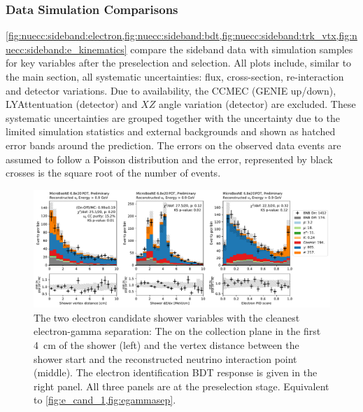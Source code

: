 \subsubsection{Data Simulation Comparisons}

 \cref{fig:nuecc:sideband:electron,fig:nuecc:sideband:bdt,fig:nuecc:sideband:trk_vtx,fig:nuecc:sideband:e_kinematics} compare the sideband data with simulation samples for key variables after the preselection and selection. All plots include, similar to the main section, all systematic uncertainties: flux, cross-section, re-interaction and detector variations. Due to availability, the CCMEC (GENIE up/down), LYAttentuation (detector) and $XZ$ angle variation (detector) are excluded. These systematic uncertainties are grouped together with the uncertainty due to the limited simulation statistics and external backgrounds and shown as hatched error bands around the prediction. The errors on the observed data events are assumed to follow a Poisson distribution and the error, represented by black crosses is the square root of the number of events. 

\begin{figure}[htb] 
    \centering
    \includegraphics[height=0.27\textheight]{Sidebands/Figures/nuecc/run123/fake_before.pdf}
\caption{\label{fig:nuecc:sideband:electron} The two electron candidate shower variables with the cleanest electron-gamma separation: The \dedx on the collection plane in the first \SI{4}{\cm} of the shower (left) and the vertex distance between the shower start and the reconstructed neutrino interaction point (middle). The electron identification BDT response is given in the right panel. All three panels are at the preselection stage. Equivalent to \cref{fig:e_cand_1,fig:egammasep}.}
\end{figure}

